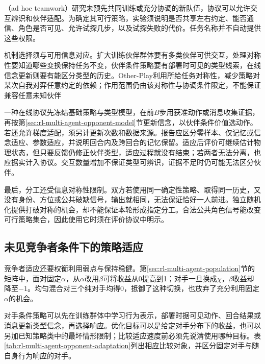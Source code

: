 （ad hoc teamwork）研究未预先共同训练或充分协调的新队伍，协议可以允许交互辨识和伙伴适配。为确定其可行策略，实验须说明是否共享左右约定、能否通信、角色是否可见、允许试探几步，以及试探失败的代价。任务名称并不自动提供这些权限。

机制选择须与可用信息对应。扩大训练伙伴群体要有多类伙伴可供交互，处理对称性要知道哪些变换保持任务不变，伙伴条件策略要有部署时可见的类型线索，在线信念更新则要有能区分类型的历史。Other-Play利用所给任务对称性，减少策略对某次自我对弈任意约定的依赖；作用范围仍由该对称性与协调条件限定，不能保证兼容任意未知伙伴

一种在线协议先冻结基础策略与类型模型，在前$B$步用获准动作或消息收集证据，再按第\ref{sec:rl-multi-agent-opponent-model}节更新信念，以伙伴条件价值选动作。若还允许梯度适配，须另计更新次数和数据来源。报告应区分零样本、仅记忆或信念适应、参数适应，并说明回合内及跨回合的记忆保留。适应后评价可继续估计物理状态，但只要反馈仍修正伙伴类型，适应过程就没有结束；若两者无法分离，也应据实计入协议。交互数量增加不保证类型可辨识，证据不足时仍可能无法区分伙伴。

最后，分工还受信息对称性限制。双方若使用同一确定性策略、取得同一历史，又没有身份、方位或公共破缺信号，输出就相同，无法保证恰好一人前进。独立随机化提供打破对称的机会，却不能保证本轮形成指定分工。合法公共角色信号能改变可行策略集合，因此使用它时须在评价协议中明示。

\subsection{未见竞争者条件下的策略适应}
\label{sec:rl-multi-agent-new-opponents}

竞争者适应还要权衡利用弱点与保持稳健。第\ref{sec:rl-multi-agent-population}节的矩阵中，面对固定$\alpha$，从$\alpha$改用$\beta$可将收益从0提高到1；对手一旦换成$\chi$，$\beta$收益却降至$-1$。均匀混合对三个纯对手均得0，抵御了这种切换，也放弃了充分利用固定$\alpha$的机会。

对手条件策略可以先在训练群体中学习行为表示，部署时据可见动作、回合结果或消息更新类型信念，再选择响应。优化目标可以是给定对手分布下的收益，也可以另加已知策略类中的最坏情形限制；比较适应速度前必须先说清使用哪种目标。表\ref{tab:rl-multi-agent-opponent-adaptation}列出相应比较对象，并区分固定对手与随自身行为响应的对手。

